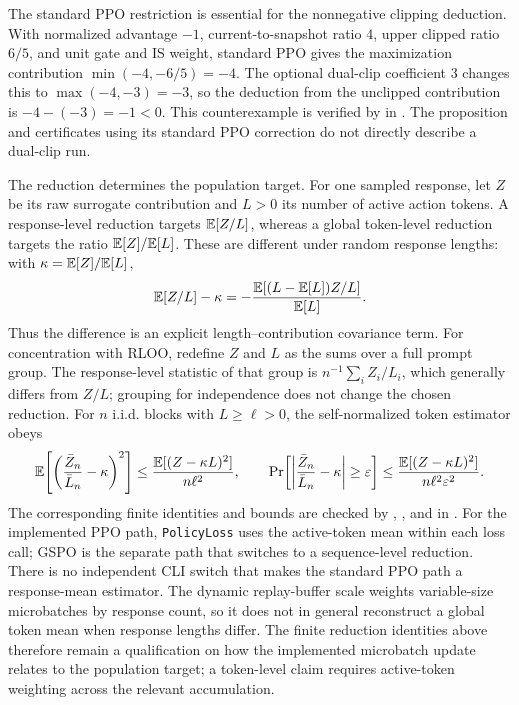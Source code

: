 The standard PPO restriction is essential for the nonnegative clipping
deduction. With normalized advantage $-1$, current-to-snapshot ratio $4$,
upper clipped ratio $6/5$, and unit gate and IS weight, standard PPO gives
the maximization contribution $\min(-4,-6/5)=-4$. The optional dual-clip
coefficient $3$ changes this to $\max(-4,-3)=-3$, so the deduction from
the unclipped contribution is $-4-(-3)=-1<0$.
This counterexample is verified by
 in
. The proposition and certificates using
its standard PPO correction do not directly describe a dual-clip run.

The reduction determines the population target. For one sampled response, let $Z$ be its raw surrogate contribution and
$L>0$ its number of active action tokens. A response-level reduction targets $\mathbb{E}[Z/L]$, whereas a global token-level
reduction targets the ratio $\mathbb{E}[Z]/\mathbb{E}[L]$. These are different under random response lengths: with
$\kappa=\mathbb{E}[Z]/\mathbb{E}[L]$,
\begin{equation*}
    \mathbb{E}[Z/L]-\kappa
    =-\frac{\mathbb{E}[(L-\mathbb{E}[L])Z/L]}{\mathbb{E}[L]}.
\end{equation*}
Thus the difference is an explicit length--contribution covariance term.
For concentration with RLOO, redefine $Z$ and $L$ as the sums over a full
prompt group. The response-level statistic of that group is
$n^{-1}\sum_i Z_i/L_i$, which generally differs from $Z/L$;
grouping for independence does not change the chosen reduction.
For $n$ i.i.d. blocks with $L\ge \ell>0$,
the self-normalized token estimator obeys
\begin{equation*}
    \mathbb{E}\!\left[\left(\frac{\bar Z_n}{\bar L_n}-\kappa\right)^2\right]
    \le \frac{\mathbb{E}[(Z-\kappa L)^2]}{n\ell^2},\qquad
    \Pr\!\left[\left|\frac{\bar Z_n}{\bar L_n}-\kappa\right|\ge\varepsilon\right]
    \le \frac{\mathbb{E}[(Z-\kappa L)^2]}{n\ell^2\varepsilon^2}.
\end{equation*}
The corresponding finite identities and bounds are checked by
, , and
 in .
For the implemented PPO path, \texttt{PolicyLoss} uses the active-token mean
within each loss call; GSPO is the separate path that switches to a
sequence-level reduction. There is no independent CLI switch that makes the
standard PPO path a response-mean estimator. The dynamic replay-buffer scale
weights variable-size microbatches by response count, so it does not in
general reconstruct a global token mean when response lengths differ. The
finite reduction identities above therefore remain a qualification on how the
implemented microbatch update relates to the population target; a token-level
claim requires active-token weighting across the relevant accumulation.

